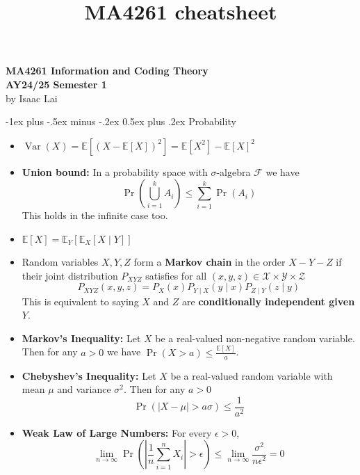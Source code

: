 \documentclass[frenchspacing,9pt,landscape,a4paper]{article}
\title{MA4261 cheatsheet}
\makeatletter
\renewcommand{\section}{\@startsection{section}{1}{0mm}%
                                {-1ex plus -.5ex minus -.2ex}%
                                {0.5ex plus .2ex}%
                                {\normalfont\large\bfseries}}
\newcommand{\abs}[1]{\left\lvert #1 \right\rvert}
\DeclareMathOperator{\pr}{Pr}
\DeclareMathOperator{\var}{Var}
\theoremstyle{remark}
\makeatother
\begin{document}
\raggedright
\footnotesize

\begin{multicols}{4} %
\setlength{\premulticols}{1pt}
\setlength{\postmulticols}{1pt}
\setlength{\multicolsep}{1pt}
\setlength{\columnsep}{2pt}
\begin{mdframed}
\begin{center}
    \large{\textbf{MA4261 Information and Coding Theory}} \\
    \normalsize{\textbf{AY24/25 Semester 1}}\\
    \small{by Isaac Lai}
\end{center}	
\end{mdframed}

\section{Probability}
\begin{itemize}
    \item $\var(X)=\mathbb{E}[(X-\mathbb{E}[X])^2]=\mathbb{E}[X^2]-\mathbb{E}[X]^2$
    \item \textbf{Union bound:} In a probability space with $\sigma$-algebra  $\mathcal{F}$ we have
        \[\pr\left(\bigcup_{i=1}^k A_i\right)\leq\sum_{i=1}^k\pr(A_i)\] This holds in the infinite case
        too.
    \item $\mathbb{E}[X]=\mathbb{E}_Y[\mathbb{E}_X[X\mid Y]]$
    \item Random variables $X,Y,Z$ form a \textbf{Markov chain} in the order  $X-Y-Z$ if their joint
        distribution $P_{XYZ}$ satisfies for all  $(x,y,z)\in\mathcal{X}\times\mathcal{Y}\times\mathcal{Z}$
        \[P_{XYZ}(x,y,z)=P_X(x)P_{Y\mid X}(y\mid x)P_{Z\mid Y}(z\mid y)\]
        This is equivalent to saying $X$ and  $Z$ are \textbf{conditionally independent given $Y$}.
    \item \textbf{Markov's Inequality:} Let $X$ be a real-valued non-negative random variable. Then for any
        $a>0$ we have  $\pr(X>a)\leq \frac{\mathbb{E}[X]}{a}$.
    \item \textbf{Chebyshev's Inequality:} Let $X$ be a real-valued random variable with mean  $\mu$ and
        variance  $\sigma^2$. Then for any $a>0$
        \[\pr(\abs{X-\mu}>a\sigma)\leq \frac{1}{a^2}\]
    \item \textbf{Weak Law of Large Numbers:} For every $\epsilon>0$,
        \[\lim_{n\to\infty}\pr\left(\abs{\frac{1}{n}\sum_{i=1}^n
        X_i}>\epsilon\right)\leq\lim_{n\to\infty}\frac{\sigma^2}{n\epsilon^2}=0\]
\end{itemize}

\end{multicols}
\end{document}
